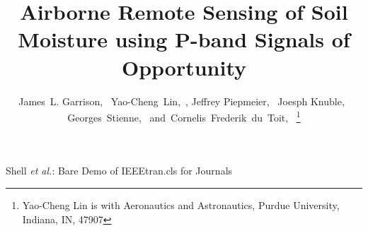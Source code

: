 \documentclass[draftcls,onecolumn]{IEEEtran}  %
\begin{document}
%
\title{Airborne Remote Sensing of Soil Moisture using P-band Signals of Opportunity}
%
%
%

\author{James~L. Garrison,~
        Yao-Cheng~Lin,~,
        Jeffrey Piepmeier,~
        Joesph Knuble,~
        Georges~Stienne,~
        and~Cornelis~Frederik~du~Toit,~%
\thanks{Yao-Cheng Lin is with Aeronautics and Astronautics, Purdue University, Indiana,
IN, 47907}}

% 
%



%
{Shell \MakeLowercase{\textit{et al.}}: Bare Demo of IEEEtran.cls for Journals}
% 
\end{document}

